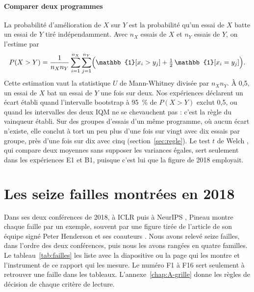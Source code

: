 \paragraph{Comparer deux programmes}
La probabilité d'amélioration de $X$ sur $Y$ est la probabilité qu'un essai de $X$ batte un essai de
$Y$ tiré indépendamment. Avec $n_X$ essais de $X$ et $n_Y$ essais de $Y$, on l'estime par
\begin{equation}
  P(X > Y) = \frac{1}{n_X n_Y} \sum_{i=1}^{n_X} \sum_{j=1}^{n_Y} \Bigl( \mathbb{1}[x_i > y_j] + \tfrac{1}{2}\, \mathbb{1}[x_i = y_j] \Bigr).
\end{equation}
Cette estimation vaut la statistique $U$ de Mann-Whitney divisée par $n_X n_Y$. À 0,5, un essai de $X$
bat un essai de $Y$ une fois sur deux. Nos expériences déclarent un écart établi quand l'intervalle
bootstrap à 95~\% de $P(X > Y)$ exclut 0,5, ou quand les intervalles des deux IQM ne se chevauchent
pas : c'est la règle du vainqueur établi. Sur des groupes d'essais d'un même programme, où aucun écart
n'existe, elle conclut à tort un peu plus
d'une fois sur vingt avec dix essais par groupe, près d'une fois sur dix avec cinq
(section~\ref{sec:regle}). Le test $t$ de Welch \parencite{welch1947generalization}, qui compare deux
moyennes sans supposer les variances égales, sert seulement dans les expériences E1 et B1, puisque
c'est lui que la figure de 2018 employait.

\section{Les seize failles montrées en 2018}\label{sec:failles}

Dans ses deux conférences de 2018, à ICLR puis à NeurIPS \parencite{pineau2018iclr,pineau2018neurips},
Pineau montre chaque faille par un exemple, souvent par une figure tirée de l'article de son équipe
signé Peter Henderson et ses coauteurs \parencite{henderson2018matters}. Nous avons relevé seize
failles, dans l'ordre des deux conférences, puis nous les avons rangées en quatre familles. Le tableau~\ref{tab:failles} les liste avec la diapositive ou la page qui les montre et l'instrument de ce
rapport qui les mesure. Le numéro F1 à F16 sert seulement à retrouver une faille dans les tableaux.
L'annexe~\ref{chap:A-grille} donne les règles de décision de chaque critère de lecture.

